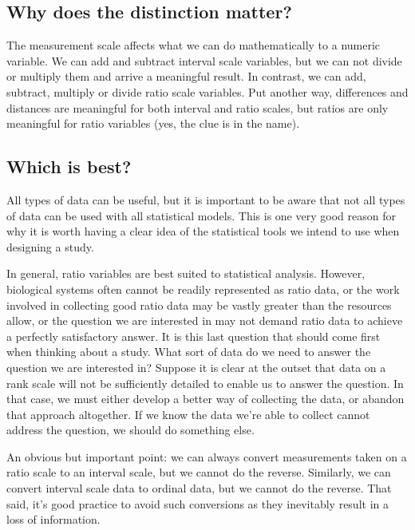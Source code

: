 \documentclass[
]{book}
\begin{document}
\hypertarget{why-does-the-distinction-matter}{%
\subsection{Why does the distinction matter?}\label{why-does-the-distinction-matter}}

The measurement scale affects what we can do mathematically to a numeric variable. We can add and subtract interval scale variables, but we can not divide or multiply them and arrive a meaningful result. In contrast, we can add, subtract, multiply or divide ratio scale variables. Put another way, differences and distances are meaningful for both interval and ratio scales, but ratios are only meaningful for ratio variables (yes, the clue is in the name).

\hypertarget{which-is-best}{%
\subsection{Which is best?}\label{which-is-best}}

All types of data can be useful, but it is important to be aware that not all types of data can be used with all statistical models. This is one very good reason for why it is worth having a clear idea of the statistical tools we intend to use when designing a study.

In general, ratio variables are best suited to statistical analysis. However, biological systems often cannot be readily represented as ratio data, or the work involved in collecting good ratio data may be vastly greater than the resources allow, or the question we are interested in may not demand ratio data to achieve a perfectly satisfactory answer. It is this last question that should come first when thinking about a study. What sort of data do we need to answer the question we are interested in? Suppose it is clear at the outset that data on a rank scale will not be sufficiently detailed to enable us to answer the question. In that case, we must either develop a better way of collecting the data, or abandon that approach altogether. If we know the data we're able to collect cannot address the question, we should do something else.

An obvious but important point: we can always convert measurements taken on a ratio scale to an interval scale, but we cannot do the reverse. Similarly, we can convert interval scale data to ordinal data, but we cannot do the reverse. That said, it's good practice to avoid such conversions as they inevitably result in a loss of information.
\end{document}
